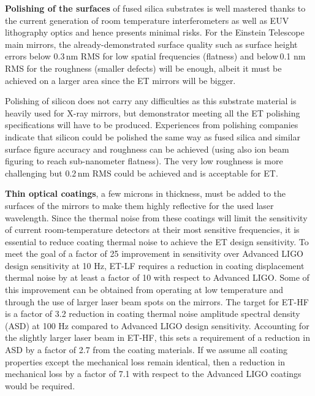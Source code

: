 \textbf{Polishing of the surfaces} of fused silica substrates is well mastered
thanks to the current generation of room temperature interferometers as well as EUV
lithography optics and hence presents minimal risks. For the Einstein Telescope
main mirrors, the already-demonstrated surface quality such as surface
height errors below 0.3\,nm RMS for low spatial frequencies (flatness) and below\,0.1 nm
RMS for the roughness (smaller defects) will be enough, albeit it must be
achieved on a larger area since the ET mirrors will be bigger.

Polishing of silicon does not carry any difficulties as this substrate material is heavily used for X-ray mirrors, but demonstrator meeting all the ET polishing specifications will have to be produced. Experiences from polishing companies indicate that silicon could be polished the same way as fused silica and similar surface figure accuracy and roughness can be achieved (using also ion beam figuring to reach sub-nanometer flatness). The very low roughness is more challenging but 0.2\,nm RMS could be achieved and is acceptable for ET. 

\textbf{Thin optical coatings}, a few microns in thickness, must be added to the surfaces of the mirrors to make them highly reflective for the used laser wavelength. 
Since the thermal noise from these coatings will limit the sensitivity of current room-temperature detectors at their most sensitive frequencies, it is essential to reduce coating thermal noise to achieve the ET design sensitivity.
To meet the goal of a factor of 25 improvement in sensitivity over Advanced LIGO design sensitivity at 10 Hz, ET-LF requires a reduction in coating displacement thermal noise by at least a factor of 10 with respect to Advanced LIGO.
Some of this improvement can be obtained from operating at low temperature and through the use of larger laser beam spots on the mirrors.
The target for ET-HF is a factor of 3.2 reduction in coating thermal noise
amplitude spectral density (ASD)
at 100 Hz compared to Advanced LIGO design sensitivity. Accounting for the slightly
larger laser beam in ET-HF, this sets a requirement of a reduction in ASD by a
factor of 2.7 from the coating materials. If we assume all coating properties
except the mechanical loss remain identical, then a reduction in mechanical loss
by a factor of 7.1 with respect to the Advanced LIGO coatings would be required.

